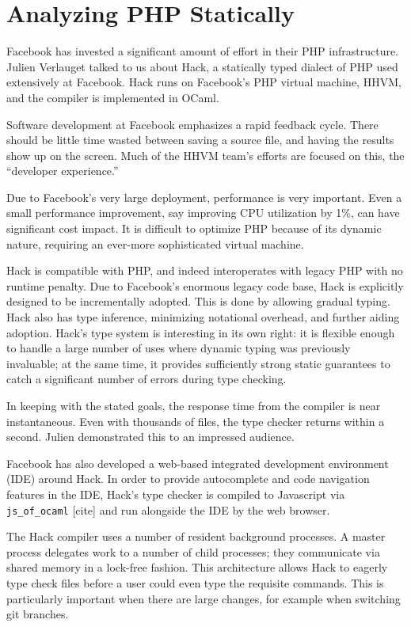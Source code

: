 \documentclass{jfp1}
\newcommand\needcite{{\color{red} [cite]}\xspace}
\begin{document}
\section{Analyzing PHP Statically}


Facebook has invested a significant amount of effort in their PHP
infrastructure. Julien Verlauget talked to us about Hack, a statically
typed dialect of PHP used extensively at Facebook. Hack runs on
Facebook's PHP virtual machine, HHVM, and the compiler is implemented
in OCaml.

Software development at Facebook emphasizes a rapid feedback cycle.
There should be little time wasted between saving a source file, and
having the results show up on the screen. Much of the HHVM team's
efforts are focused on this, the ``developer experience.''

Due to Facebook's very large deployment, performance is very important.
Even a small performance improvement, say improving CPU utilization 
by 1\%, can have significant cost impact. It is difficult to optimize PHP
because of its dynamic nature, requiring an ever-more sophisticated 
virtual machine.

Hack is compatible with PHP, and indeed interoperates with legacy PHP
with no runtime penalty. Due to Facebook's enormous legacy code base, 
Hack is explicitly designed to be incrementally adopted. This is done
by allowing gradual typing. Hack also has type inference, minimizing
notational overhead, and further aiding adoption. Hack's type system
is interesting in its own right: it is flexible enough to handle a large
number of uses where dynamic typing was previously invaluable; at
the same time, it provides sufficiently strong static guarantees to catch
a significant number of errors during type checking.

In keeping with the stated goals, the response time from the compiler
is near instantaneous. Even with thousands of files, the type checker 
returns within a second. Julien demonstrated this to an impressed 
audience.

Facebook has also developed a web-based integrated development
environment (IDE) around Hack. In order to provide autocomplete and
code navigation features in the IDE, Hack's type checker is compiled 
to Javascript via \texttt{js\_of\_ocaml}\needcite and run alongside the 
IDE by the web browser.

The Hack compiler uses a number of resident background processes. A
master process delegates work to a number of child processes; they
communicate via shared memory in a lock-free fashion. This
architecture allows Hack to eagerly type check files before a user
could even type the requisite commands. This is particularly important
when there are large changes, for example when switching git branches.
\end{document}
